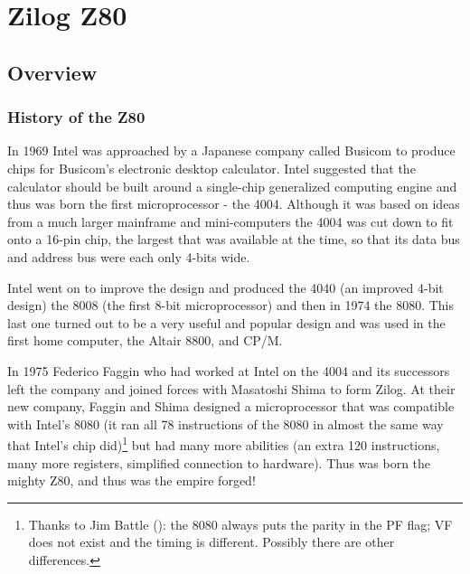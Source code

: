 \chapter{Zilog Z80}



\ChapterTOC

\pagebreak
\section{Overview}
\subsection{History of the Z80}

In 1969 Intel was approached by a Japanese company called Busicom to produce chips for Busicom's electronic desktop calculator. Intel suggested that the calculator should be built around a single-chip generalized computing engine and thus was born the first microprocessor - the 4004. Although it was based on ideas from a much larger mainframe and mini-computers the 4004 was cut down to fit onto a 16-pin chip, the largest that was available at the time, so that its data bus and address bus were each only 4-bits wide. 

Intel went on to improve the design and produced the 4040 (an improved 4-bit design) the 8008 (the first 8-bit microprocessor) and then in 1974 the 8080. This last one turned out to be a very useful and popular design and was used in the first home computer, the Altair 8800, and CP/M. 

In 1975 Federico Faggin who had worked at Intel on the 4004 and its successors left the company and joined forces with Masatoshi Shima to form Zilog. At their new company, Faggin and Shima designed a microprocessor that was compatible with Intel's 8080 (it ran all 78 instructions of the 8080 in almost the same way that Intel's chip did)\footnote{Thanks to Jim Battle (): the 8080 always puts the parity in the PF flag; VF does not exist and the timing is different. Possibly there are other differences.} but had many more abilities (an extra 120 instructions, many more registers, simplified connection to hardware). Thus was born the mighty Z80, and thus was the empire forged!

